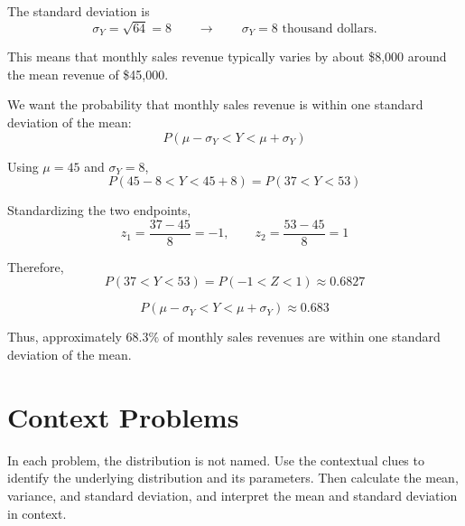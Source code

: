 
The standard deviation is
\[
\sigma_Y=\sqrt{64}=8
\qquad \longrightarrow \qquad
\boxed{\sigma_Y=8\text{ thousand dollars}}.
\]

This means that monthly sales revenue typically varies by about
\$8,000 around the mean revenue of \$45,000.


We want the probability that monthly sales revenue is within one standard
deviation of the mean:
\[
P(\mu-\sigma_Y<Y<\mu+\sigma_Y)
\]

Using $\mu=45$ and $\sigma_Y=8$,
\[
P(45-8<Y<45+8)
=
P(37<Y<53)
\]

Standardizing the two endpoints,
\[
z_1=\frac{37-45}{8}=-1,
\qquad
z_2=\frac{53-45}{8}=1
\]

Therefore,
\[
P(37<Y<53)
=
P(-1<Z<1)
\approx0.6827
\]

\[
\boxed{P(\mu-\sigma_Y<Y<\mu+\sigma_Y)\approx0.683}
\]

Thus, approximately $68.3\%$ of monthly sales revenues are within one
standard deviation of the mean.


\newpage
\section{Context Problems}\label{sec:c4-context-problems}

In each problem, the distribution is not named. Use the contextual clues to
identify the underlying distribution and its parameters. Then calculate the
mean, variance, and standard deviation, and interpret the mean and standard
deviation in context.


